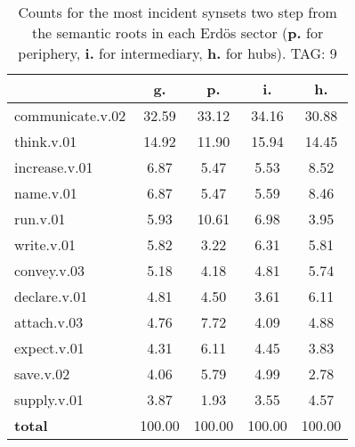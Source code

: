 \begin{table}[h!]
\begin{center}
\begin{tabular}{| l | c | c | c | c |}\hline
 & g. & p. & i. & h. \\\hline
communicate.v.02 & 32.59  & 33.12  & 34.16  & 30.88 \\\hline
think.v.01 & 14.92  & 11.90  & 15.94  & 14.45 \\\hline
increase.v.01 & 6.87  & 5.47  & 5.53  & 8.52 \\\hline
name.v.01 & 6.87  & 5.47  & 5.59  & 8.46 \\\hline
run.v.01 & 5.93  & 10.61  & 6.98  & 3.95 \\\hline
write.v.01 & 5.82  & 3.22  & 6.31  & 5.81 \\\hline
convey.v.03 & 5.18  & 4.18  & 4.81  & 5.74 \\\hline
declare.v.01 & 4.81  & 4.50  & 3.61  & 6.11 \\\hline
attach.v.03 & 4.76  & 7.72  & 4.09  & 4.88 \\\hline
expect.v.01 & 4.31  & 6.11  & 4.45  & 3.83 \\\hline
save.v.02 & 4.06  & 5.79  & 4.99  & 2.78 \\\hline
supply.v.01 & 3.87  & 1.93  & 3.55  & 4.57 \\\hline
{{\bf total}} & 100.00  & 100.00  & 100.00  & 100.00 \\\hline
\end{tabular}
\caption{Counts for the most incident synsets two step from the semantic roots in each Erd\"os sector ({\bf p.} for periphery, {\bf i.} for intermediary, {\bf h.} for hubs). TAG: 9}
\end{center}
\end{table}